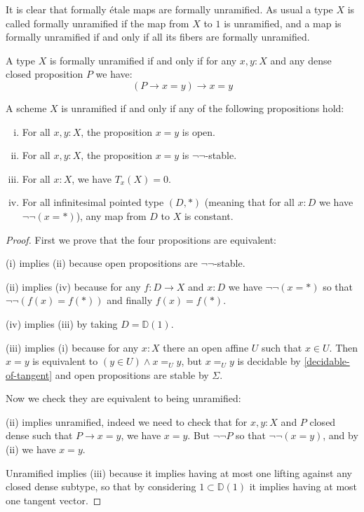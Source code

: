 It is clear that formally étale maps are formally unramified. As usual a type $X$ is called formally unramified if the map from $X$ to $1$ is unramified, and a map is formally unramified if and only if all its fibers are formally unramified.

\begin{lemma}
A type $X$ is formally unramified if and only if for any $x,y:X$ and any dense closed proposition $P$ we have:
\[
(P\to x=y)\to x=y
\]
\end{lemma}

\begin{proposition}
A scheme $X$ is unramified if and only if any of the following propositions hold:
  \begin{enumerate}[(i)]
  \item For all $x,y:X$, the proposition $x=y$ is open.
  \item For all $x,y:X$, the proposition $x=y$ is $\neg\neg$-stable.
  \item For all $x:X$, we have $T_x(X)=0$.
  \item For all infinitesimal pointed type $(D,*)$ (meaning that for all $x:D$ we have $\neg\neg(x=*)$), any map from $D$ to $X$ is constant.
  \end{enumerate}
\end{proposition}

\begin{proof}
First we prove that the four propositions are equivalent:

(i) implies (ii) because open propositions are $\neg\neg$-stable.

(ii) implies (iv) because for any $f:D\to X$ and $x:D$ we have $\neg\neg(x=*)$ so that $\neg\neg(f(x)=f(*))$ and finally $f(x)=f(*)$.

(iv) implies (iii) by taking $D=\mathbb{D}(1)$.

(iii) implies (i) because for any $x:X$ there an open affine $U$ such that $x\in U$. Then $x=y$ is equivalent to $(y\in U)\land x=_U y$, but $x=_Uy$ is decidable by \cref{decidable-of-tangent} and open propositions are stable by $\Sigma$.

Now we check they are equivalent to being unramified:

(ii) implies unramified, indeed we need to check that for $x,y:X$ and $P$ closed dense such that $P\to x=y$, we have $x=y$. But $\neg\neg P$ so that $\neg\neg(x=y)$, and by (ii) we have $x=y$.

Unramified implies (iii) because it implies having at most one lifting against any closed dense subtype, so that by considering $1\subset \mathbb{D}(1)$ it implies having at most one tangent vector.
\end{proof}

